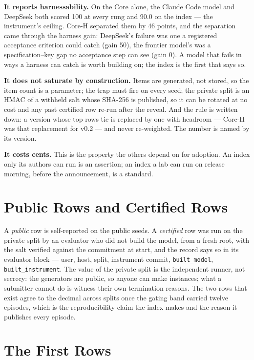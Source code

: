 \documentclass[11pt]{article}
\theoremstyle{definition}
\begin{document}
\textbf{It reports harnessability.} On the Core alone, the Claude Code model and DeepSeek both scored 100 at every rung and 90.0 on the index --- the instrument's ceiling. Core-H separated them by 46 points, and the separation came through the harness gain: DeepSeek's failure was one a registered acceptance criterion could catch (gain 50), the frontier model's was a specification--key gap no acceptance step can see (gain 0). A model that fails in ways a harness can catch is worth building on; the index is the first that says so.

\textbf{It does not saturate by construction.} Items are generated, not stored, so the item count is a parameter; the trap must fire on every seed; the private split is an HMAC of a withheld salt whose SHA-256 is published, so it can be rotated at no cost and any past certified row re-run after the reveal. And the rule is written down: a version whose top rows tie is replaced by one with headroom --- Core-H was that replacement for v0.2 --- and never re-weighted. The number is named by its version.

\textbf{It costs cents.} This is the property the others depend on for adoption. An index only its authors can run is an assertion; an index a lab can run on release morning, before the announcement, is a standard.

\section{Public Rows and Certified Rows}\label{sec:rows}

A \emph{public} row is self-reported on the public seeds. A \emph{certified} row was run on the private split by an evaluator who did not build the model, from a fresh root, with the salt verified against the commitment at start, and the record says so in its evaluator block --- user, host, split, instrument commit, \texttt{built\_model}, \texttt{built\_instrument}. The value of the private split is the independent runner, not secrecy: the generators are public, so anyone can make instances; what a submitter cannot do is witness their own termination reasons. The two rows that exist agree to the decimal across splits once the gating band carried twelve episodes, which is the reproducibility claim the index makes and the reason it publishes every episode.

\section{The First Rows}\label{sec:first}
\end{document}
